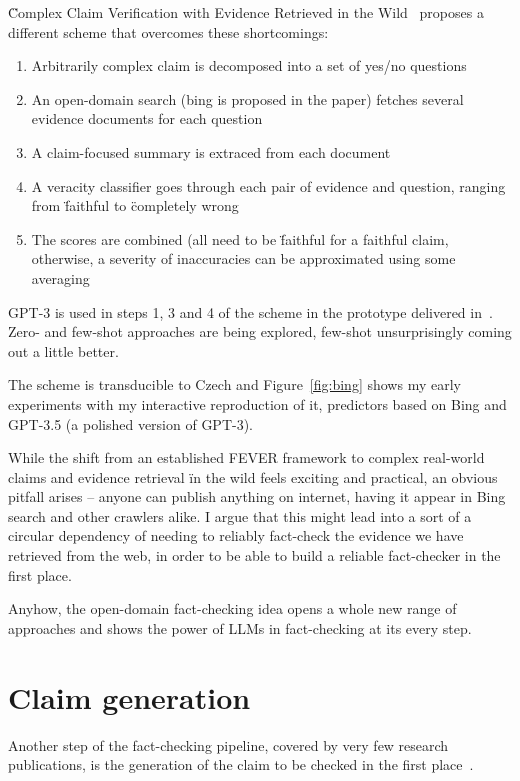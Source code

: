 \"{Complex Claim Verification with Evidence Retrieved in the Wild}~\cite{bing} proposes a different scheme that overcomes these shortcomings:

\begin{enumerate}
    \item Arbitrarily complex claim is decomposed into a set of yes/no questions
    \item An open-domain search (bing is proposed in the paper) fetches several evidence documents for each question
    \item A claim-focused summary is extraced from each document
    \item A veracity classifier goes through each pair of evidence and question, ranging from \"{faithful} to \"{completely wrong}
    \item The scores are combined (all need to be \"{faithful} for a faithful claim, otherwise, a severity of inaccuracies can be approximated using some averaging 
\end{enumerate}

GPT-3 is used in steps 1, 3 and 4 of the scheme in the prototype delivered in~\cite{bing}. Zero- and few-shot approaches are being explored, few-shot unsurprisingly coming out a little better.

The scheme is transducible to Czech and Figure~\ref{fig:bing} shows my early experiments with my interactive reproduction of it, predictors based on Bing and GPT-3.5 (a polished version of GPT-3).

While the shift from an established FEVER framework to complex real-world claims and evidence retrieval \"{in the wild} feels exciting and practical, an obvious pitfall arises -- anyone can publish anything on internet, having it appear in Bing search and other crawlers alike. I argue that this might lead into a sort of a circular dependency of needing to reliably fact-check the evidence we have retrieved from the web, in order to be able to build a reliable fact-checker in the first place.

Anyhow, the open-domain fact-checking idea opens a whole new range of approaches and shows the power of LLMs in fact-checking at its every step.

\section{Claim generation}
Another step of the fact-checking pipeline, covered by very few research publications, is the generation of the claim to be checked in the first place~\cite{guo-etal-2022-survey}.

